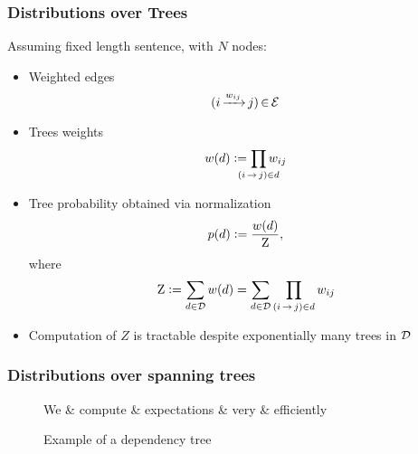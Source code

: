 \documentclass{beamer}
\newcommand{\defeq}{\vcentcolon=}
\begin{document}
\begin{frame}
\frametitle{Distributions over Trees}
Assuming fixed length sentence, with $N$ nodes:
\begin{itemize}
    \item Weighted edges $$(i\,{\xrightarrow[]{{w_{ij}}}}\, j) \,{\in}\, {\mathcal{E}}$$
    \item Trees weights $$\wtree{\tree} \defeq \smashoperator{\prod_{\edgeij\in\tree}} \wedge{ij}$$
    \item Tree probability obtained via normalization
        $$\ptree{\tree} \defeq \frac{\wtree{\tree}}{\wbar},$$
        where
        $$\wbar \defeq \sumtree \wtree{\tree}=\sumtree \prod_{\edgeij \in \tree} \wedge{ij}$$
    \item Computation of $Z$ is tractable despite exponentially many trees in ${\mathcal{D}}$
\end{itemize}
\end{frame}

\begin{frame}
    \frametitle{Distributions over spanning trees}
\begin{figure}[H]
    \centering
    \begin{dependency}[theme = simple]
    \begin{deptext}[column sep=0.5em]
      We \& compute \& expectations \& very \& efficiently \\
    \end{deptext}
    \end{dependency}
    \caption{Example of a dependency tree}
    \label{fig:deptree}
\end{figure}

\end{frame}
\end{document}
